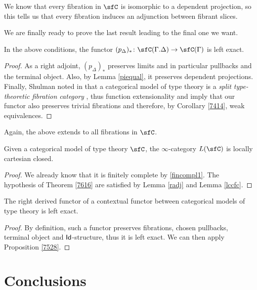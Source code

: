 We know that every fibration in $\sfC$ is isomorphic to a dependent
projection, so this tells us that every fibration induces an adjunction
between fibrant slices.

We are finally ready to prove the last result leading to the final one we want.

\begin{lem}\label{lccfc}
  In the above conditions, the functor
  $(p_\Delta)_*\colon\sfC(\Gamma.\Delta)\rightarrow\sfC(\Gamma)$ is left exact.
\end{lem}
\begin{proof}
  As a right adjoint, $(p_\Delta)_*$ preserves limits and in particular
  pullbacks and the terminal object. Also, by Lemma \ref{piequal}, it preserves
  dependent projections. Finally, Shulman noted in \cite[21]{Shu14} that a
  categorical model of type theory is a \emph{split type-theoretic fibration
  category} \cite[Def.~4.1]{Shu14}, thus function extensionality and
  \cite[Thm.~5.9]{Shu14} imply that our functor also preserves trivial
  fibrations and therefore, by Corollary \ref{7414}, weak equivalences.
\end{proof}

Again, the above extends to all fibrations in $\sfC$.

\begin{thm}\label{finalthm}
  Given a categorical model of type theory $\sfC$, the $\infty$-category $L(\sfC)$
  is locally cartesian closed.
\end{thm}
\begin{proof}
  We already know that it is finitely complete by \ref{fincompl1}. The
  hypothesis of Theorem \ref{7616} are satisfied by Lemma \ref{radj} and Lemma
  \ref{lccfc}.
\end{proof}

\begin{thm}
  The right derived functor of a contextual functor between categorical models
  of type theory is left exact.
\end{thm}
\begin{proof}
  By definition, such a functor preserves fibrations, chosen pullbacks, terminal
  object and $\operatorname{\mathsf{Id}}$-structure, thus it is left exact. We can then apply
  Proposition \ref{7528}.
\end{proof}

\section{Conclusions}
